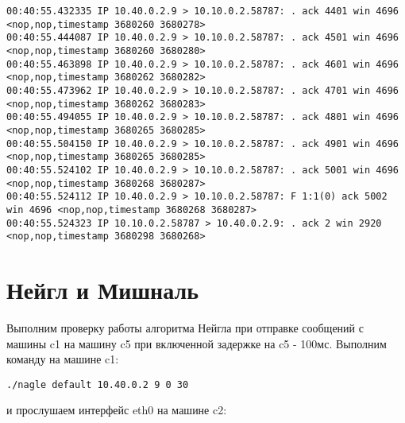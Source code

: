 \documentclass[a4paper,12pt]{article}
\begin{document}
\begin{Verbatim}
00:40:55.432335 IP 10.40.0.2.9 > 10.10.0.2.58787: . ack 4401 win 4696 <nop,nop,timestamp 3680260 3680278>
00:40:55.444087 IP 10.40.0.2.9 > 10.10.0.2.58787: . ack 4501 win 4696 <nop,nop,timestamp 3680260 3680280>
00:40:55.463898 IP 10.40.0.2.9 > 10.10.0.2.58787: . ack 4601 win 4696 <nop,nop,timestamp 3680262 3680282>
00:40:55.473962 IP 10.40.0.2.9 > 10.10.0.2.58787: . ack 4701 win 4696 <nop,nop,timestamp 3680262 3680283>
00:40:55.494055 IP 10.40.0.2.9 > 10.10.0.2.58787: . ack 4801 win 4696 <nop,nop,timestamp 3680265 3680285>
00:40:55.504150 IP 10.40.0.2.9 > 10.10.0.2.58787: . ack 4901 win 4696 <nop,nop,timestamp 3680265 3680285>
00:40:55.524102 IP 10.40.0.2.9 > 10.10.0.2.58787: . ack 5001 win 4696 <nop,nop,timestamp 3680268 3680287>
00:40:55.524112 IP 10.40.0.2.9 > 10.10.0.2.58787: F 1:1(0) ack 5002 win 4696 <nop,nop,timestamp 3680268 3680287>
00:40:55.524323 IP 10.10.0.2.58787 > 10.40.0.2.9: . ack 2 win 2920 <nop,nop,timestamp 3680298 3680268>
\end{Verbatim}


\section{Нейгл и Мишналь}

Выполним проверку работы алгоритма Нейгла при отправке сообщений с машины c1 на машину c5 при включенной задержке на c5 - 100мс. Выполним команду на машине c1:

\begin{Verbatim}
./nagle default 10.40.0.2 9 0 30
\end{Verbatim}

и прослушаем интерфейс eth0 на машине c2:
\end{document}
